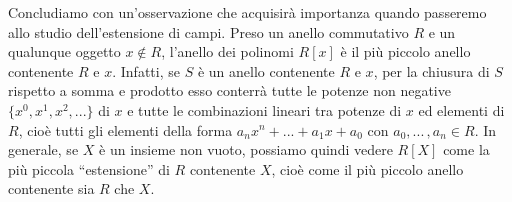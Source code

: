 \noindent Concludiamo con un'osservazione che acquisirà importanza quando passeremo allo studio dell'estensione di campi. 
Preso un anello commutativo $R$ e un qualunque oggetto $x\not\in R$, l'anello dei polinomi $R[x]$ è il più piccolo anello contenente $R$ e $x$. 
Infatti, se $S$ è un anello contenente $R$ e $x$, per la chiusura di $S$ rispetto a somma e prodotto esso conterrà tutte le potenze non negative 
$\{x^0, x^1, x^2, ...\}$ di $x$ e tutte le combinazioni lineari tra potenze di $x$ ed elementi di $R$, cioè tutti gli elementi della forma 
$a_nx^n + ... + a_1x+a_0$ con $a_0,...\,,a_n\in R$. In generale, se $X$ è un insieme non vuoto, 
possiamo quindi vedere $R[X]$ come la più piccola ``estensione'' di $R$ contenente $X$, cioè come il più piccolo anello contenente sia $R$ che $X$.

\clearpage
